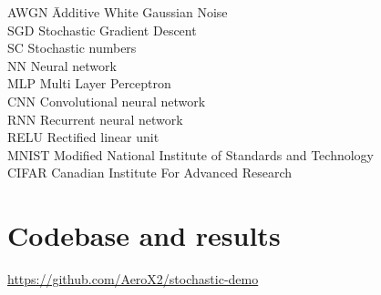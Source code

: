 \documentclass[a4paper,oneside,phd,etd]{BYUPhys}
\begin{document}
\begin{tabbing}

AWGN \qquad \qquad \= Additive White Gaussian Noise\\
SGD \> Stochastic Gradient Descent\\
SC \> Stochastic numbers\\
NN \> Neural network \\
MLP \> Multi Layer Perceptron \\
CNN \> Convolutional neural network \\
RNN \> Recurrent neural network \\
RELU \> Rectified linear unit \\
MNIST \> Modified National Institute of Standards and Technology \\
CIFAR \> Canadian Institute For Advanced Research \\
\end{tabbing}


\appendix
\section{Codebase and results}
\url{https://github.com/AeroX2/stochastic-demo}

%

%


%
\end{document}
